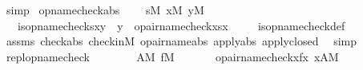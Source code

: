 \begin{isabellebody}
\ simp%
\endisatagproof
{\isafoldproof}%
%
\isadelimproof
\isanewline
%
\endisadelimproof
\isanewline
\isanewline
{}\isamarkupfalse%
\ opname{\isacharunderscore}{\kern0pt}check{\isacharunderscore}{\kern0pt}abs\ {\isacharcolon}{\kern0pt}\isanewline
\ \ \ {\isachardoublequoteopen}s{\isasymin}M{\isachardoublequoteclose}\ {\isachardoublequoteopen}x{\isasymin}M{\isachardoublequoteclose}\ {\isachardoublequoteopen}y{\isasymin}M{\isachardoublequoteclose}\ \isanewline
\ \ \ {\isachardoublequoteopen}is{\isacharunderscore}{\kern0pt}opname{\isacharunderscore}{\kern0pt}check{\isacharparenleft}{\kern0pt}s{\isacharcomma}{\kern0pt}x{\isacharcomma}{\kern0pt}y{\isacharparenright}{\kern0pt}\ {\isasymlongleftrightarrow}\ y\ {\isacharequal}{\kern0pt}\ opair{\isacharunderscore}{\kern0pt}name{\isacharparenleft}{\kern0pt}check{\isacharparenleft}{\kern0pt}x{\isacharparenright}{\kern0pt}{\isacharcomma}{\kern0pt}s{\isacharbackquote}{\kern0pt}x{\isacharparenright}{\kern0pt}{\isachardoublequoteclose}\ \isanewline
%
\isadelimproof
\ \ %
\endisadelimproof
%
\isatagproof
{}\isamarkupfalse%
\ is{\isacharunderscore}{\kern0pt}opname{\isacharunderscore}{\kern0pt}check{\isacharunderscore}{\kern0pt}def\ \ \isanewline
\ \ \isamarkupfalse%
\ assms\ check{\isacharunderscore}{\kern0pt}abs\ check{\isacharunderscore}{\kern0pt}in{\isacharunderscore}{\kern0pt}M\ opair{\isacharunderscore}{\kern0pt}name{\isacharunderscore}{\kern0pt}abs\ apply{\isacharunderscore}{\kern0pt}abs\ apply{\isacharunderscore}{\kern0pt}closed\ \isamarkupfalse%
\ simp%
\endisatagproof
{\isafoldproof}%
%
\isadelimproof
\isanewline
%
\endisadelimproof
\isanewline
{}\isamarkupfalse%
\ repl{\isacharunderscore}{\kern0pt}opname{\isacharunderscore}{\kern0pt}check\ {\isacharcolon}{\kern0pt}\isanewline
\ \ \isanewline
\ \ \ \ {\isachardoublequoteopen}A{\isasymin}M{\isachardoublequoteclose}\ {\isachardoublequoteopen}f{\isasymin}M{\isachardoublequoteclose}\ \isanewline
\ \ \isanewline
\ \ \ {\isachardoublequoteopen}{\isacharbraceleft}{\kern0pt}opair{\isacharunderscore}{\kern0pt}name{\isacharparenleft}{\kern0pt}check{\isacharparenleft}{\kern0pt}x{\isacharparenright}{\kern0pt}{\isacharcomma}{\kern0pt}f{\isacharbackquote}{\kern0pt}x{\isacharparenright}{\kern0pt}{\isachardot}{\kern0pt}\ x{\isasymin}A{\isacharbraceright}{\kern0pt}{\isasymin}M{\isachardoublequoteclose}\isanewline
%
\isadelimproof
%
\endisadelimproof
%
\isatagproof
{}\isamarkupfalse%
\ {\isacharminus}{\kern0pt}\isanewline

\end{isabellebody}
